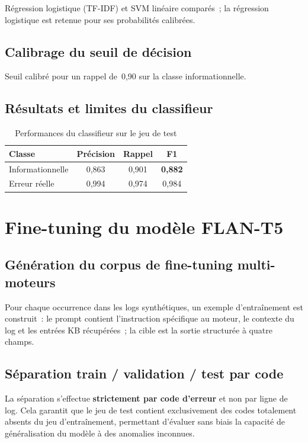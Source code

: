 \documentclass[12pt,a4paper]{report}
\begin{document}
R\'egression logistique (TF-IDF) et SVM lin\'eaire compar\'es~; la r\'egression
logistique est retenue pour ses probabilit\'es calibr\'ees.

\subsection{Calibrage du seuil de d\'ecision}

Seuil calibr\'e pour un rappel de~0,90 sur la classe informationnelle.

\subsection{R\'esultats et limites du classifieur}

\begin{table}[H]
  \centering
  \caption{Performances du classifieur sur le jeu de test}
  \label{tab:classif_perf}
  \begin{tabular}{lccc}
    \toprule
    \textbf{Classe} & \textbf{Pr\'ecision} & \textbf{Rappel} & \textbf{F1} \\
    \midrule
    Informationnelle & 0,863 & 0,901 & \textbf{0,882} \\
    Erreur r\'eelle  & 0,994 & 0,974 & 0,984 \\
    \bottomrule
  \end{tabular}
\end{table}

\section{Fine-tuning du mod\`ele FLAN-T5}

\subsection{G\'en\'eration du corpus de fine-tuning multi-moteurs}

Pour chaque occurrence dans les logs synth\'etiques, un exemple d'entra\^inement
est construit~: le prompt contient l'instruction sp\'ecifique au moteur, le contexte
du log et les entr\'ees KB r\'ecup\'er\'ees~; la cible est la sortie structur\'ee
\`a quatre champs.

\subsection{S\'eparation train / validation / test par code}

La s\'eparation s'effectue \textbf{strictement par code d'erreur} et non par ligne de log.
Cela garantit que le jeu de test contient exclusivement des codes totalement absents du
jeu d'entra\^inement, permettant d'\'evaluer sans biais la capacit\'e de g\'en\'eralisation
du mod\`ele \`a des anomalies inconnues.
\end{document}
